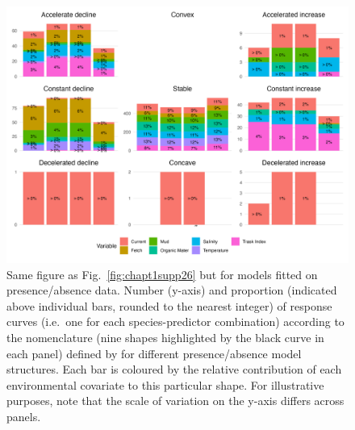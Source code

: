 \begin{figure}
\hypertarget{fig:chapt1supp27}{%
\centering
\includegraphics{03-Chapitre1/figures/supplementary/fig_supp27.png}
\caption{Same figure as Fig.~\ref{fig:chapt1supp26} but for models
fitted on presence/absence data. Number (y-axis) and proportion
(indicated above individual bars, rounded to the nearest integer) of
response curves (i.e.~one for each species-predictor combination)
according to the nomenclature (nine shapes highlighted by the black
curve in each panel) defined by \textcite{Rigal_2020} for different
presence/absence model structures. Each bar is coloured by the relative
contribution of each environmental covariate to this particular shape.
For illustrative purposes, note that the scale of variation on the
y-axis differs across panels.}\label{fig:chapt1supp27}
}
\end{figure}

